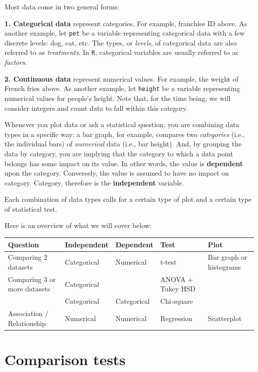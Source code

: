 \documentclass[
]{book}
\begin{document}
Most data come in two general forms:

\textbf{1. Categorical data} represent categories. For example, franchise ID above. As another example, let \texttt{pet} be a variable representing categorical data with a few discrete levels: dog, cat, etc. The types, or \emph{levels}, of categorical data are also referred to as \emph{treatments}. In \texttt{R}, categorical variables are usually referred to as \emph{factors}.

\textbf{2. Continuous data} represent numerical values. For example, the weight of French fries above. As another example, let \texttt{height} be a variable representing numerical values for people's height. Note that, for the time being, we will consider integers and count data to fall within this category.

Whenever you plot data or ask a statistical question, you are combining data types in a specific way: a bar graph, for example, compares two \emph{categories} (i.e., the individual bars) of \emph{numerical} data (i.e., bar height). And, by grouping the data by category, you are implying that the category to which a data point belongs has some impact on its value. In other words, the value is \textbf{dependent} upon the category. Conversely, the value is assumed to have no impact on category. Category, therefore is the \textbf{independent} variable.

Each combination of data types calls for a certain type of plot and a certain type of statistical test.

Here is an overview of what we will cover below:

\begin{tabular}{l|l|l|l|l}
\hline
Question & Independent & Dependent & Test & Plot\\
\hline
Comparing 2 datasets & Categorical & Numerical & t-test & Bar graph or histograms\\
\hline
Comparing 3 or more datasets & Categorical &  & ANOVA + Tukey HSD & \\
\hline
 & Categorical & Categorical & Chi-square & \\
\hline
Association / Relationship & Numerical & Numerical & Regression & Scatterplot\\
\hline
\end{tabular}

\hypertarget{comparison-tests}{%
\section*{Comparison tests}\label{comparison-tests}}
\end{document}

